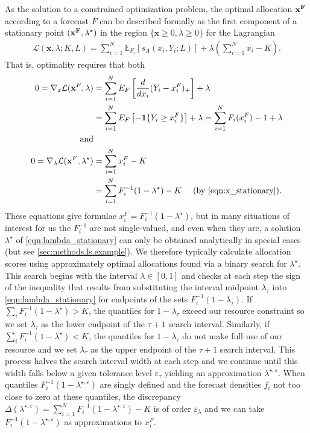 \documentclass{article}
\begin{document}
As the solution to a constrained optimization problem, the optimal allocation $\bf{x}^F$ according to a forecast $F$ can be described formally as the first component of a stationary point $(\bf{x}^F, \lambda^{\star})$ in the region $\{\mathbf{x} \geq 0, \lambda \geq 0\}$ for the Lagrangian 
\begin{align}
\mathcal{L}(\mathbf{x},\lambda; K, L) = \sum_{i=1}^{N} \mathbb{E}_{F_i}[s_A(x_i, Y_i; L)] + \lambda\left(\sum_{i=1}^{N} x_i - K\right).
\end{align}
That is, optimality requires that both
\begin{align}
0 = \nabla_{x} \mathcal{L}(\mathbf{x}^F, \lambda) &= \sum_{i=1}^{N} E_F \left[\frac{d}{dx_i}(Y_i - x_i^F)_{+}\right] + \lambda \\
& = \sum_{i=1}^{N} E_F \left[-\mathbf{1}\{Y_i \geq x_i^F\}\right] + \lambda  = \sum_{i=1}^{N} F_i(x_i^F)-1 + \lambda  \label{eqn:x_stationary}\\
\text{ and} \\
0 = \nabla_{\lambda} \mathcal{L}(\mathbf{x}^F, \lambda^{\star}) &= \sum_{i=1}^{N} x_i^F - K\\
& = \sum_{i=1}^{N} F_{i}^{-1}(1-\lambda^{\star}) - K \quad \text{ (by \eqref{eqn:x_stationary})}. \label{eqn:lambda_stationary}
\end{align}
These equations give formulae $x_i^F = F_i^{-1}(1-\lambda^{\star})$, but in many situations of interest for us the $F_i^{-1}$ are not single-valued, and even 
when they are, a solution $\lambda^{\star}$ of \eqref{eqn:lambda_stationary} can only be obtained analytically in special cases (but see \ref{sec:methods.ls.example}). We therefore typically calculate allocation scores using approximately optimal allocations found via a binary search for $\lambda^{\star}$.  This search begins with the interval $\lambda \in [0,1]$ and 
checks at each step the sign of the inequality that results from substituting the interval midpoint $\lambda_{\tau}$ into \eqref{eqn:lambda_stationary} for endpoints of the sets $F_i^{-1}(1-\lambda_{\tau})$.  If $\sum_{i} F_{i}^{-1}(1-\lambda^{\star}) > K$, the quantiles for $1-\lambda_{\tau}$ exceed our resource constraint so we set $\lambda_{\tau}$ as the lower endpoint of the $\tau + 1$ search interval.  Similarly, if $\sum_{i} F_{i}^{-1}(1-\lambda^{\star}) < K$, the quantiles for 
$1-\lambda_{\tau}$ do not make full use of our resource and we set $\lambda_{\tau}$ as the upper endpoint of the $\tau + 1$ search interval.  This process halves the search interval width at each step and we continue until this width falls below a given tolerance level $\varepsilon_{\tau}$ yielding an 
approximation $\lambda^{\star, \varepsilon}$. When quantiles $F_i^{-1}(1-\lambda^{\star, \varepsilon})$ are singly defined and the forecast densities $f_i$
not too close to zero at these quantiles, the discrepancy $\Delta(\lambda^{\star, \varepsilon})  = \sum_{i=1}^{N} F_{i}^{-1}(1-\lambda^{\star, \varepsilon}) - K$ is of order $\varepsilon_{\lambda}$ and we can take $F_{i}^{-1}(1-\lambda^{\star, \varepsilon})$ as approximations to $x_i^F$.
\end{document}
